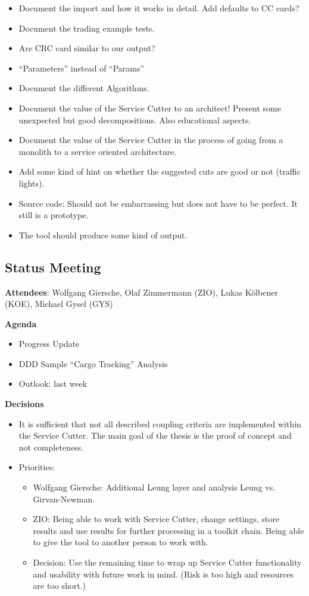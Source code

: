 \begin{itemize}
\item Document the import and how it works in detail. Add defaults to CC cards?
\item Document the trading example tests.
\item Are CRC card similar to our output?
\item \enquote{Parameters} instead of \enquote{Params}
\item Document the different Algorithms.
\item Document the value of the Service Cutter to an architect! Present some unexpected but good decompositions. Also educational aspects.
\item Document the value of the Service Cutter in the process of going from a monolith to a service oriented architecture. 
\item Add some kind of hint on whether the suggested cuts are good or not (traffic lights).
\item Source code: Should not be embarrassing but does not have to be perfect. It still is a prototype.
\item The tool should produce some kind of output.

\end{itemize}

\subsection{Status Meeting }

\textbf{Attendees}: Wolfgang Giersche, Olaf Zimmermann (ZIO), Lukas Kölbener (KOE), Michael Gysel (GYS)

\textbf{Agenda} 

\begin{itemize}
\item Progress Update
\item DDD Sample “Cargo Tracking” Analysis 
\item Outlook: last week
\end{itemize}

\textbf{Decisions}

\begin{itemize}
\item It is sufficient that not all described coupling criteria are implemented within the Service Cutter. The main goal of the thesis is the proof of concept and not completeness.
\item Priorities:
	\begin{itemize}
	\item Wolfgang Giersche: Additional Leung layer and analysis Leung vs. Girvan-Newman.
	\item ZIO: Being able to work with Service Cutter, change settings, store results and use results for further processing in a toolkit chain. Being able to give the tool to another person to work with.
	\item Decision: Use the remaining time to wrap up Service Cutter functionality and usability with future work in mind. (Risk is too high and resources are too short.)
	\end{itemize}

\end{itemize}


